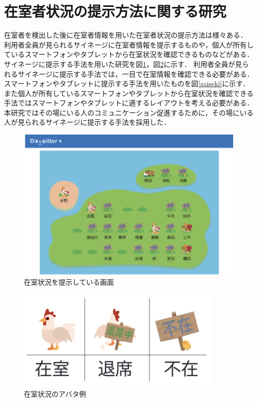 \section{在室者状況の提示方法に関する研究}\label{2.3}
在室者を検出した後に在室者情報を用いた在室者状況の提示方法は様々ある\cite{picture}\cite{iptelephone}\cite{staycomment}\cite{kasika}\cite{zaiseki}．
利用者全員が見られるサイネージに在室者情報を提示するものや，個人が所有しているスマートフォンやタブレットから在室状況を確認できるものなどがある．
サイネージに提示する手法を用いた研究を図\ref{staystate}\cite{kasika}，図\ref{stayniwatori}\cite{kasika}に示す．
利用者全員が見られるサイネージに提示する手法では，一目で在室情報を確認できる必要がある．
スマートフォンやタブレットに提示する手法を用いたものを図\ref{zaiseki}\cite{zaiseki}に示す．
また個人が所有しているスマートフォンやタブレットから在室状況を確認できる手法ではスマートフォンやタブレットに適するレイアウトを考える必要がある．
本研究ではその場にいる人のコミュニケーション促進するために，その場にいる人が見られるサイネージに提示する手法を採用した．
\begin{figure}[H]
  \begin{center}
    \includegraphics[width=160mm]{image/staystate.png}
    \caption{在室状況を提示している画面\cite{kasika}}
    \label{staystate}
  \end{center}
\end{figure}
\begin{figure}[H]
  \begin{center}
    \includegraphics[width=100mm]{image/stayniwatori.png}
    \caption{在室状況のアバタ例\cite{kasika}}
    \label{stayniwatori}
  \end{center}
\end{figure}
